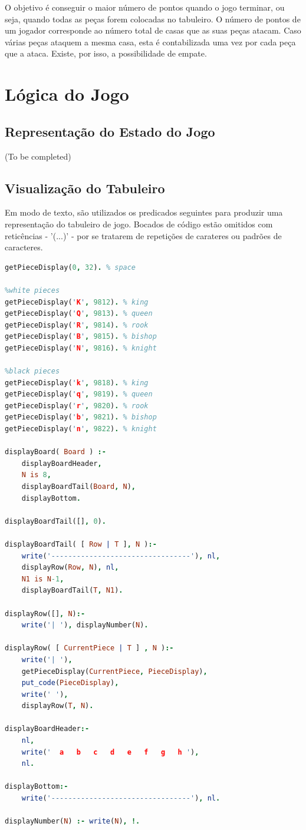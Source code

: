\documentclass[a4paper]{article}
\begin{document}
O objetivo é conseguir o maior número de pontos quando o jogo terminar, ou seja, quando todas as peças forem colocadas no tabuleiro.
O número de pontos de um jogador corresponde ao número total de casas que as suas peças atacam.
Caso várias peças ataquem a mesma casa, esta é contabilizada uma vez por cada peça que a ataca.
Existe, por isso, a possibilidade de empate.

\section{Lógica do Jogo}

\subsection{Representação do Estado do Jogo}
(To be completed)

\subsection{Visualização do Tabuleiro}
Em modo de texto, são utilizados os predicados seguintes para produzir uma representação do tabuleiro de jogo. Bocados de código estão omitidos com reticências - '(...)' - por se tratarem de repetições de carateres ou padrões de caracteres.\linebreak

\begin{small}
\begin{lstlisting}[language=Prolog]
getPieceDisplay(0, 32). % space

%white pieces
getPieceDisplay('K', 9812). % king
getPieceDisplay('Q', 9813). % queen
getPieceDisplay('R', 9814). % rook
getPieceDisplay('B', 9815). % bishop
getPieceDisplay('N', 9816). % knight

%black pieces
getPieceDisplay('k', 9818). % king
getPieceDisplay('q', 9819). % queen
getPieceDisplay('r', 9820). % rook
getPieceDisplay('b', 9821). % bishop
getPieceDisplay('n', 9822). % knight

displayBoard( Board ) :-
	displayBoardHeader,
	N is 8,
	displayBoardTail(Board, N),
	displayBottom.

displayBoardTail([], 0).

displayBoardTail( [ Row | T ], N ):-
	write('---------------------------------'), nl,
	displayRow(Row, N), nl,
	N1 is N-1,
	displayBoardTail(T, N1).

displayRow([], N):-
	write('| '), displayNumber(N).

displayRow( [ CurrentPiece | T ] , N ):-
	write('| '),
	getPieceDisplay(CurrentPiece, PieceDisplay),
	put_code(PieceDisplay),
	write(' '),
	displayRow(T, N).

displayBoardHeader:-
	nl,
	write('  a   b   c   d   e   f   g   h '),
	nl.

displayBottom:-
	write('---------------------------------'), nl.

displayNumber(N) :- write(N), !.
\end{lstlisting}
\end{small}
\end{document}
